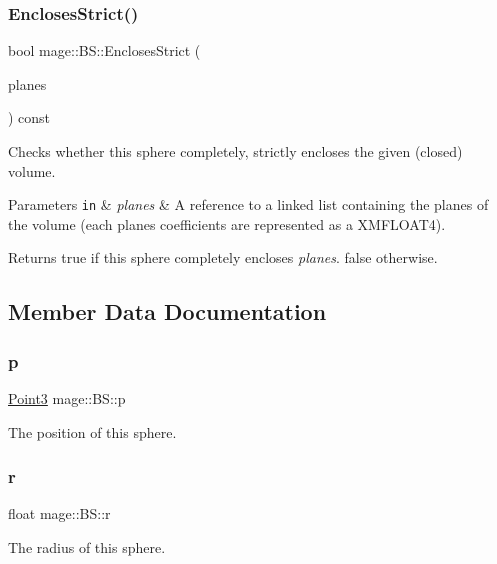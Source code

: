 \subsubsection{\texorpdfstring{Encloses\+Strict()}{EnclosesStrict()}}
{\footnotesize\ttfamily bool mage\+::\+B\+S\+::\+Encloses\+Strict (\begin{DoxyParamCaption}\item[{const list$<$ X\+M\+F\+L\+O\+A\+T4 $>$ \&}]{planes }\end{DoxyParamCaption}) const}

Checks whether this sphere completely, strictly encloses the given (closed) volume.


\begin{DoxyParams}[1]{Parameters}
\mbox{\tt in}  & {\em planes} & A reference to a linked list containing the planes of the volume (each plane\textquotesingle{}s coefficients are represented as a {\ttfamily X\+M\+F\+L\+O\+A\+T4}). \\
\hline
\end{DoxyParams}
\begin{DoxyReturn}{Returns}
{\ttfamily true} if this sphere completely encloses {\itshape planes}. {\ttfamily false} otherwise. 
\end{DoxyReturn}


\subsection{Member Data Documentation}
\hypertarget{structmage_1_1_b_s_a9c6ad8f37fa6b98179e8108c8584fdcf}{}\label{structmage_1_1_b_s_a9c6ad8f37fa6b98179e8108c8584fdcf} 
\subsubsection{\texorpdfstring{p}{p}}
{\footnotesize\ttfamily \hyperlink{structmage_1_1_point3}{Point3} mage\+::\+B\+S\+::p}

The position of this sphere. \hypertarget{structmage_1_1_b_s_ab2e786e8493feb28a3bc0216e8dea5bc}{}\label{structmage_1_1_b_s_ab2e786e8493feb28a3bc0216e8dea5bc} 
\subsubsection{\texorpdfstring{r}{r}}
{\footnotesize\ttfamily float mage\+::\+B\+S\+::r}

The radius of this sphere. 